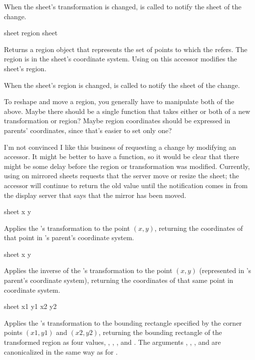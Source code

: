 When the sheet's transformation is changed,  is
called to notify the sheet of the change.

 {sheet}
 {region sheet}

Returns a region object that represents the set of points to which the
  refers.  The region is in the sheet's coordinate
system.  Using  on this accessor modifies the sheet's region.

When the sheet's region is changed,  is called
 to notify the sheet of the change.

 {To reshape and move a region, you generally have to manipulate
both of the above.  Maybe there should be a single function that takes either
or both of a new transformation or region?  Maybe region coordinates should be
expressed in parents' coordinates, since that's easier to set only one?}

 {I'm not convinced I like this business of requesting a change by
modifying an accessor.  It might be better to have a  function, so
it would be clear that there might be some delay before the region or
transformation was modified.  Currently, using  on mirrored sheets
requests that the server move or resize the sheet; the accessor will continue to
return the old value until the notification comes in from the display server
that says that the mirror has been moved.}


 {sheet x y}

Applies the  's transformation to the point $(x,y)$,
returning the coordinates of that point in 's parent's coordinate
system.

 {sheet x y}

Applies the inverse of the  's transformation to the
point $(x,y)$ (represented in 's parent's coordinate system),
returning the coordinates of that same point in  coordinate system.

 {sheet x1 y1 x2 y2} 

Applies the  's transformation to the bounding rectangle
specified by the corner points $(x1,y1)$ and $(x2,y2)$, returning the bounding
rectangle of the transformed region as four values, , ,
, and .  The arguments , , , and
 are canonicalized in the same way as for .

